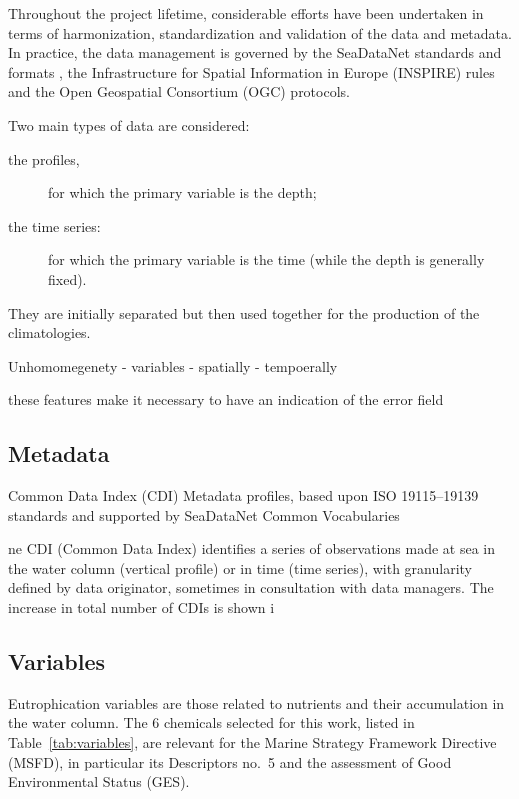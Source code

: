 \documentclass[essd, manuscript]{copernicus}
\begin{document}
Throughout the project lifetime, considerable efforts have been undertaken in terms of harmonization, standardization and validation of the data and metadata. In practice, the data management is governed by the SeaDataNet standards and formats \citep{Schaap2010}, the Infrastructure for Spatial Information in Europe (INSPIRE) rules and the Open Geospatial Consortium (OGC) protocols. 

Two main types of data are considered: 
\begin{description}
\item[the profiles,] for which the primary variable is the depth;
\item[the time series:] for which the primary variable is the time (while the depth is generally fixed).
\end{description}
They are initially separated but then used together for the production of the climatologies. 

Unhomomegenety
- variables
- spatially
- tempoerally

these features make it necessary to have an indication of the error field

%

\subsection{Metadata}

Common Data Index (CDI) Metadata profiles, based upon ISO 19115–19139 standards and supported by SeaDataNet Common Vocabularies

ne CDI (Common Data Index)
identifies a series of observations made at sea in the water column
(vertical profile) or in time (time series), with granularity defined by
data originator, sometimes in consultation with data managers. The
increase in total number of CDIs is shown i

\subsection{Variables\label{sec:variables}}

Eutrophication variables are those related to nutrients and their accumulation in the water column. The 6 chemicals selected for this work, listed in Table~\ref{tab:variables}, are relevant for the Marine Strategy Framework Directive (MSFD), in particular its Descriptors no.~5 and the assessment of Good Environmental Status (GES). 
\end{document}
